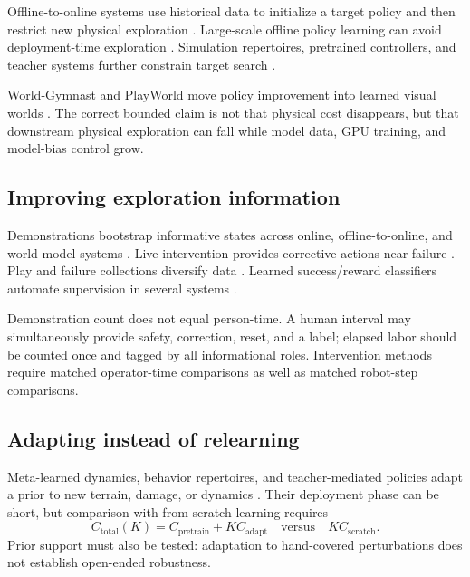 \documentclass[11pt]{article}
\begin{document}
Offline-to-online systems use historical data to initialize a target policy and then restrict new physical exploration \cite{walke2023ariel,hu2023reboot,nair2020awac,singh2021cog,kumar2023ptr}. Large-scale offline policy learning can avoid deployment-time exploration \cite{chebotar2023qtransformer,zhou2023realorl}. Simulation repertoires, pretrained controllers, and teacher systems further constrain target search \cite{cully2015adaptanimals,johannink2019residual,hu2025robottrainsrobot}.

World-Gymnast and PlayWorld move policy improvement into learned visual worlds \cite{sharma2026worldgymnast,yin2026playworld}. The correct bounded claim is not that physical cost disappears, but that downstream physical exploration can fall while model data, GPU training, and model-bias control grow.

\subsection{Improving exploration information}

Demonstrations bootstrap informative states across online, offline-to-online, and world-model systems \cite{luo2024serl,luo2025hilserl,liu2026autoserl,walke2023ariel,zhan2022ferm,nair2020awac,kumar2023ptr,lancaster2024modemv2,sharma2023medalpp}. Live intervention provides corrective actions near failure \cite{luo2025hilserl,zhao2025silri}. Play and failure collections diversify data \cite{kalashnikov2022mtopt,chebotar2023qtransformer,yin2026playworld}. Learned success/reward classifiers automate supervision in several systems \cite{luo2024serl,luo2025hilserl,kalashnikov2022mtopt,kumar2023ptr,sharma2026worldgymnast,yin2026playworld}.

Demonstration count does not equal person-time. A human interval may simultaneously provide safety, correction, reset, and a label; elapsed labor should be counted once and tagged by all informational roles. Intervention methods require matched operator-time comparisons as well as matched robot-step comparisons.

\subsection{Adapting instead of relearning}

Meta-learned dynamics, behavior repertoires, and teacher-mediated policies adapt a prior to new terrain, damage, or dynamics \cite{nagabandi2019metarl,cully2015adaptanimals,hu2025robottrainsrobot}. Their deployment phase can be short, but comparison with from-scratch learning requires
\begin{equation}
C_{\mathrm{total}}(K)=C_{\mathrm{pretrain}}+K C_{\mathrm{adapt}}
\quad\text{versus}\quad
K C_{\mathrm{scratch}}.
\end{equation}
Prior support must also be tested: adaptation to hand-covered perturbations does not establish open-ended robustness.
\end{document}
